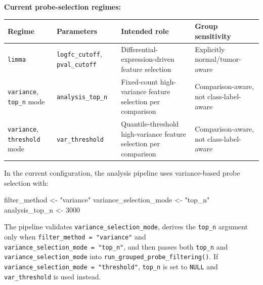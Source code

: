 \documentclass[
  letterpaper,
  DIV=11,
  numbers=noendperiod,
  openany,
  oneside]{scrreprt}
\newenvironment{Shaded}{\begin{snugshade}}{\end{snugshade}}
\newcommand{\DecValTok}[1]{\textcolor[rgb]{0.68,0.00,0.00}{#1}}
\newcommand{\NormalTok}[1]{\textcolor[rgb]{0.00,0.23,0.31}{#1}}
\newcommand{\OtherTok}[1]{\textcolor[rgb]{0.00,0.23,0.31}{#1}}
\newcommand{\StringTok}[1]{\textcolor[rgb]{0.13,0.47,0.30}{#1}}
\begin{document}
\textbf{Current probe-selection regimes:}

\begin{longtable}[]{@{}
  >{\raggedright\arraybackslash}p{}
  >{\raggedright\arraybackslash}p{}
  >{\raggedright\arraybackslash}p{}
  >{\raggedright\arraybackslash}p{}@{}}
\toprule\noalign{}
\begin{minipage}[b]{\linewidth}\raggedright
Regime
\end{minipage} & \begin{minipage}[b]{\linewidth}\raggedright
Parameters
\end{minipage} & \begin{minipage}[b]{\linewidth}\raggedright
Intended role
\end{minipage} & \begin{minipage}[b]{\linewidth}\raggedright
Group sensitivity
\end{minipage} \\
\midrule\noalign{}
\endhead
\bottomrule\noalign{}
\endlastfoot
\texttt{limma} & \texttt{logfc\_cutoff}, \texttt{pval\_cutoff} &
Differential-expression-driven feature selection & Explicitly
normal/tumor-aware \\
\texttt{variance}, \texttt{top\_n} mode & \texttt{analysis\_top\_n} &
Fixed-count high-variance feature selection per comparison &
Comparison-aware, not class-label-aware \\
\texttt{variance}, \texttt{threshold} mode & \texttt{var\_threshold} &
Quantile-threshold high-variance feature selection per comparison &
Comparison-aware, not class-label-aware \\
\end{longtable}

In the current configuration, the analysis pipeline uses variance-based
probe selection with:

\begin{Shaded}
\begin{Highlighting}[]
\NormalTok{filter\_method }\OtherTok{\textless{}{-}} \StringTok{"variance"}
\NormalTok{variance\_selection\_mode }\OtherTok{\textless{}{-}} \StringTok{"top\_n"}
\NormalTok{analysis\_top\_n }\OtherTok{\textless{}{-}} \DecValTok{3000}
\end{Highlighting}
\end{Shaded}

The pipeline validates \texttt{variance\_selection\_mode}, derives the
\texttt{top\_n} argument only when
\texttt{filter\_method\ =\ "variance"} and
\texttt{variance\_selection\_mode\ =\ "top\_n"}, and then passes both
\texttt{top\_n} and \texttt{variance\_selection\_mode} into
\texttt{run\_grouped\_probe\_filtering()}. If
\texttt{variance\_selection\_mode\ =\ "threshold"}, \texttt{top\_n} is
set to \texttt{NULL} and \texttt{var\_threshold} is used instead.
\end{document}
